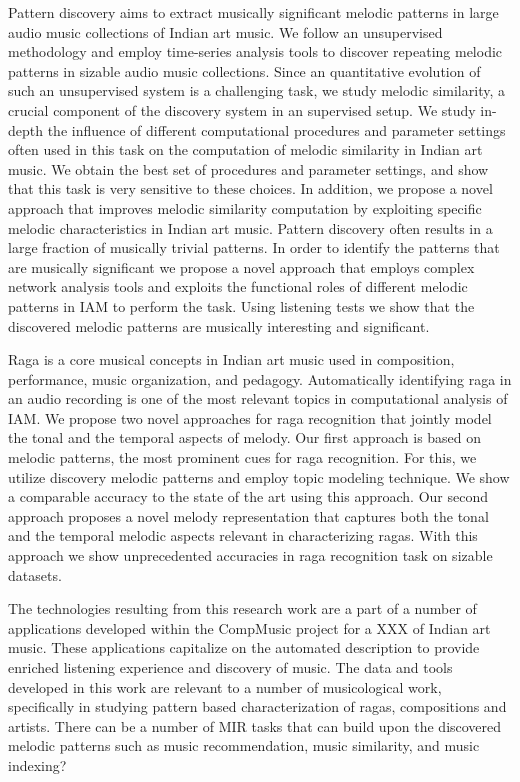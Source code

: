 Pattern discovery aims to extract musically significant melodic patterns in large audio music collections of Indian art music. We follow an unsupervised methodology and employ time-series analysis tools to discover repeating melodic patterns in sizable audio music collections. Since an quantitative evolution of such an unsupervised system is a challenging task, we study melodic similarity, a crucial component of the discovery system in an supervised setup. We study in-depth the influence of different computational procedures and parameter settings often used in this task on the computation of melodic similarity in Indian art music. We obtain the best set of procedures and parameter settings, and show that this task is very sensitive to these choices. In addition, we propose a novel approach that improves melodic similarity computation by exploiting specific melodic characteristics in Indian art music. Pattern discovery often results in a large fraction of musically trivial patterns. In order to identify the patterns that are musically significant we propose a novel approach that employs complex network analysis tools and exploits the functional roles of different melodic patterns in IAM to perform the task. Using listening tests we show that the discovered melodic patterns are musically interesting and significant.

Raga is a core musical concepts in Indian art music used in composition, performance, music organization, and pedagogy. Automatically identifying raga in an audio recording is one of the most relevant topics in computational analysis of IAM. We propose two novel approaches for raga recognition that jointly model the tonal and the temporal aspects of melody. Our first approach is based on melodic patterns, the most prominent cues for raga recognition. For this, we utilize discovery melodic patterns and employ topic modeling technique. We show a comparable accuracy to the state of the art using this approach. Our second approach proposes a novel melody representation that captures both the tonal and the temporal melodic aspects relevant in characterizing ragas. With this approach we show unprecedented accuracies in raga recognition task on sizable datasets. 

The technologies resulting from this research work are a part of a number of applications developed within the CompMusic project for a XXX of Indian art music. These applications capitalize on the automated description to provide enriched listening experience and discovery of music. The data and tools developed in this work are relevant to a number of musicological work, specifically in studying pattern based characterization of ragas, compositions and artists. There can be a number of MIR tasks that can build upon the discovered melodic patterns such as music recommendation, music similarity, and music indexing?



